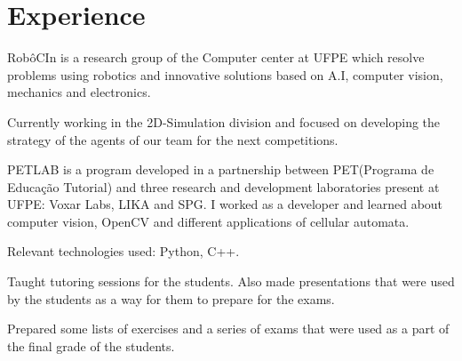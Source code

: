 \documentclass[]{deedy-resume-openfont}
\begin{document}
\hfill
\begin{minipage}[t]{0.66\textwidth} 


\section{Experience}

\vspace{\topsep} %
\begin{tightemize}
\item RobôCIn is a research group of the Computer center at UFPE which resolve problems using
robotics and innovative solutions based on A.I, computer vision, mechanics and electronics.
\item Currently working in the 2D-Simulation division and focused on developing the strategy of the agents of our team for the next competitions.
\end{tightemize}


\begin{tightemize}
\item PETLAB is a program developed in a partnership between PET(Programa de Educação Tutorial) and
 three research and development laboratories present at UFPE: Voxar Labs, LIKA and SPG. I worked as a developer and learned about computer vision, OpenCV and  different applications of cellular automata.
\item Relevant technologies used: Python, C++.
\end{tightemize}

\begin{tightemize}
\item Taught tutoring sessions for the students. Also made presentations that were used by the students as a way for them to prepare for the exams.
\item Prepared some lists of exercises and a series of exams that were used as a part of the final grade of the students.
\end{tightemize}


\end{minipage}
\end{document}
